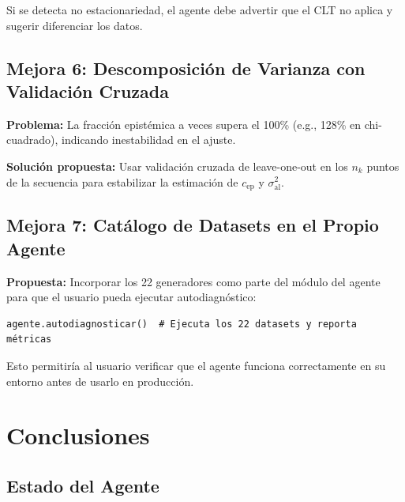 \documentclass[12pt,a4paper]{article}
\begin{document}
Si se detecta no estacionariedad, el agente debe advertir que el CLT no aplica y sugerir diferenciar los datos.

\subsection{Mejora 6: Descomposición de Varianza con Validación Cruzada}

\textbf{Problema:} La fracción epistémica a veces supera el 100\% (e.g., 128\% en chi-cuadrado), indicando inestabilidad en el ajuste.

\textbf{Solución propuesta:} Usar validación cruzada de leave-one-out en los $n_k$ puntos de la secuencia para estabilizar la estimación de $c_{\text{ep}}$ y $\sigma^2_{\text{al}}$.

\subsection{Mejora 7: Catálogo de Datasets en el Propio Agente}

\textbf{Propuesta:} Incorporar los 22 generadores como parte del módulo del agente para que el usuario pueda ejecutar autodiagnóstico:

\begin{lstlisting}
agente.autodiagnosticar()  # Ejecuta los 22 datasets y reporta métricas
\end{lstlisting}

Esto permitiría al usuario verificar que el agente funciona correctamente en su entorno antes de usarlo en producción.

\section{Conclusiones}

\subsection{Estado del Agente}
\end{document}

